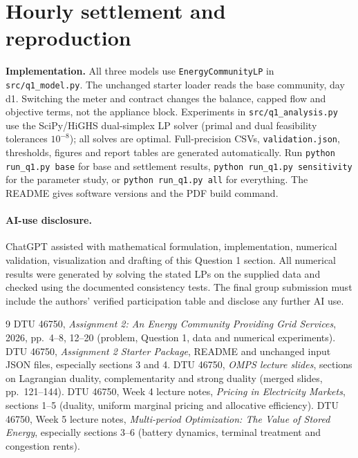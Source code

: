 \documentclass[10pt,a4paper]{article}
\renewcommand{\arraystretch}{1.07}
\begin{document}
\section{Hourly settlement and reproduction}
\label{app:code}
\begin{table}[H]
    \centering\small
    \renewcommand{\arraystretch}{0.88}
    \caption{Base community solution. Prices $p_t,\lambda_t,\mu_t$ in DKK/kWh, meter columns in kW, last column in DKK for one hour. The cap is 9.39 kW.}
    \label{tab:hourlydual}
    
\end{table}

\textbf{Implementation.} All three models use \texttt{EnergyCommunityLP} in \texttt{src/q1\_model.py}. The unchanged starter loader reads the base community, day d1. Switching the meter and contract changes the balance, capped flow and objective terms, not the appliance block. Experiments in \texttt{src/q1\_analysis.py} use the SciPy/HiGHS dual-simplex LP solver (primal and dual feasibility tolerances $10^{-8}$); all solves are optimal. Full-precision CSVs, \texttt{validation.json}, thresholds, figures and report tables are generated automatically. Run \texttt{python run\_q1.py base} for base and settlement results, \texttt{python run\_q1.py sensitivity} for the parameter study, or \texttt{python run\_q1.py all} for everything. The README gives software versions and the PDF build command.

\paragraph{AI-use disclosure.}
ChatGPT assisted with mathematical formulation, implementation, numerical validation, visualization and drafting of this Question 1 section. All numerical results were generated by solving the stated LPs on the supplied data and checked using the documented consistency tests. The final group submission must include the authors' verified participation table and disclose any further AI use.

\begin{thebibliography}{9}
\footnotesize
\setlength{\itemsep}{0pt}
\setlength{\parsep}{0pt}
 DTU 46750, \emph{Assignment 2: An Energy Community Providing Grid Services}, 2026, pp.~4--8, 12--20 (problem, Question 1, data and numerical experiments).
 DTU 46750, \emph{Assignment 2 Starter Package}, README and unchanged input JSON files, especially sections 3 and 4.
 DTU 46750, \emph{OMPS lecture slides}, sections on Lagrangian duality, complementarity and strong duality (merged slides, pp.~121--144).
 DTU 46750, Week 4 lecture notes, \emph{Pricing in Electricity Markets}, sections 1--5 (duality, uniform marginal pricing and allocative efficiency).
 DTU 46750, Week 5 lecture notes, \emph{Multi-period Optimization: The Value of Stored Energy}, especially sections 3--6 (battery dynamics, terminal treatment and congestion rents).
\end{thebibliography}
\end{document}
